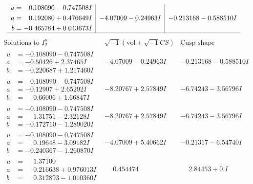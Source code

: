 \documentclass[1p]{elsarticle_modified}
\theoremstyle{definition}
\newcommand{\I}{\sqrt{-1}}
\begin{document}
$$\begin{array}{c|c|c}
\begin{aligned}
u &= -0.108090 - 0.747508 I \\
a &= \phantom{-}0.192080 + 0.476649 I \\
b &= -0.465784 + 0.043673 I\end{aligned}
 & -4.07009 - 0.24963 I & -0.213168 - 0.588510 I\\
 \hline 
 \end{array}$$\newpage$$\begin{array}{c|c|c}  
\text{Solutions to }I^u_{2}& \I (\text{vol} + \sqrt{-1}CS) & \text{Cusp shape}\\
 \hline 
\begin{aligned}
u &= -0.108090 - 0.747508 I \\
a &= -0.50426 + 2.37465 I \\
b &= -0.220687 + 1.217460 I\end{aligned}
 & -4.07009 - 0.24963 I & -0.213168 - 0.588510 I \\ \hline\begin{aligned}
u &= -0.108090 - 0.747508 I \\
a &= -0.12907 + 2.65292 I \\
b &= \phantom{-}0.66006 + 1.66847 I\end{aligned}
 & -8.20767 + 2.57849 I & -6.74243 - 3.56796 I \\ \hline\begin{aligned}
u &= -0.108090 - 0.747508 I \\
a &= \phantom{-}1.31751 - 2.32128 I \\
b &= -0.172710 - 1.289020 I\end{aligned}
 & -8.20767 + 2.57849 I & -6.74243 - 3.56796 I \\ \hline\begin{aligned}
u &= -0.108090 - 0.747508 I \\
a &= \phantom{-}0.19648 - 3.09182 I \\
b &= -0.240367 - 1.260870 I\end{aligned}
 & -4.07009 + 5.40662 I & -0.21317 - 6.54740 I \\ \hline\begin{aligned}
u &= \phantom{-}1.37100\phantom{ +0.000000I} \\
a &= \phantom{-}0.216638 + 0.976013 I \\
b &= \phantom{-}0.312893 - 1.010360 I\end{aligned}
 & \phantom{-}0.454474\phantom{ +0.000000I} & \phantom{-}2.84453 + 0. I\phantom{ +0.000000I} \\ \hline\begin{aligned}

\end{aligned}
\end{array}$$
\end{document}
